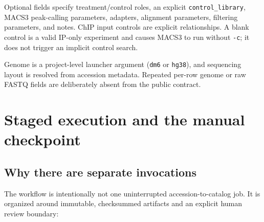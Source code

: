 \documentclass[11pt]{article}
\begin{document}
Optional fields specify treatment/control roles, an explicit
\texttt{control\_library}, MACS3 peak-calling parameters, adapters,
alignment parameters, filtering parameters, and notes.  ChIP input controls
are explicit relationships.  A blank control is a valid IP-only experiment
and causes MACS3 to run without \texttt{-c}; it does not trigger an implicit
control search.

Genome is a project-level launcher argument (\texttt{dm6} or \texttt{hg38}),
and sequencing layout is resolved from accession metadata.  Repeated
per-row genome or raw FASTQ fields are deliberately absent from the public
contract.

\section{Staged execution and the manual checkpoint}

\subsection{Why there are separate invocations}

The workflow is intentionally not one uninterrupted accession-to-catalog job.
It is organized around immutable, checksummed artifacts and an explicit human
review boundary:

\begin{center}
\end{center}
\end{document}
